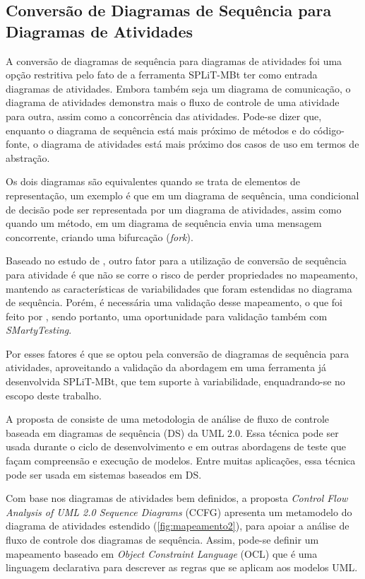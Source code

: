 \subsection{Conversão de Diagramas de Sequência para Diagramas de Atividades}
\label{cap3subsec:conversaosequencia}


A conversão de diagramas de sequência para diagramas de atividades foi uma opção restritiva pelo fato de a ferramenta SPLiT-MBt ter como entrada diagramas de atividades. Embora também seja um diagrama de comunicação, o diagrama de atividades demonstra mais o fluxo de controle de uma atividade para outra, assim como a concorrência das atividades. Pode-se dizer que, enquanto o diagrama de sequência está mais próximo de métodos e do código-fonte, o diagrama de atividades está mais próximo dos casos de uso em termos de abstração.

Os dois diagramas são equivalentes quando se trata de elementos de representação, um exemplo é que em um diagrama de sequência, uma condicional de decisão pode ser representada por um diagrama de atividades, assim como quando um método, em um diagrama de sequência envia uma mensagem concorrente, criando uma bifurcação (\textit{fork}). 

Baseado no estudo de \citet{garousi2005control}, outro fator para a utilização de conversão de sequência para atividade é que não se corre o risco de perder propriedades no mapeamento, mantendo as características de variabilidades que foram estendidas no diagrama de sequência. Porém, é necessária uma validação desse mapeamento, o que foi feito por \citet{swain2010test}, sendo portanto, uma oportunidade para validação também com \textit{SMartyTesting}.

Por esses fatores é que se optou pela conversão de diagramas de sequência para atividades, aproveitando a validação da abordagem em uma ferramenta já desenvolvida SPLiT-MBt, que tem suporte à variabilidade, enquadrando-se no escopo deste trabalho.

A proposta de \citet{garousi2005control} consiste de uma metodologia de análise de fluxo de controle baseada em diagramas de sequência (DS) da UML 2.0. Essa técnica pode ser usada durante o ciclo de desenvolvimento e em outras abordagens de teste que façam compreensão e execução de modelos. Entre muitas aplicações, essa técnica pode ser usada em sistemas baseados em DS. 

Com base nos diagramas de atividades bem definidos, a proposta \textit{Control Flow Analysis of UML 2.0 Sequence Diagrams} (CCFG) \cite{garousi2005control} apresenta um metamodelo do diagrama de atividades estendido (\ref{fig:mapeamento2}), para apoiar a análise de fluxo de controle dos diagramas de sequência. Assim, pode-se definir um mapeamento baseado em \textit{Object Constraint Language} (OCL) \cite{warmer2003object} que é uma linguagem declarativa para descrever as regras que se aplicam aos modelos UML.

